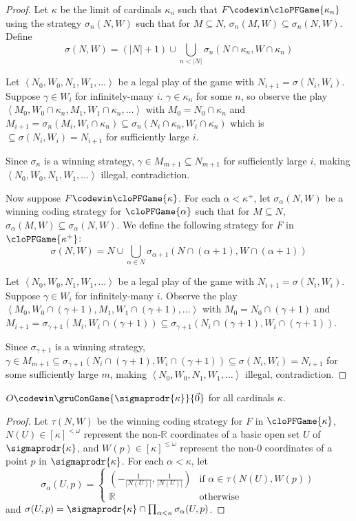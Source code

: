 \begin{proof}
Let $\kappa$ be the limit of cardinals $\kappa_n$ such that $F\codewin\cloPFGame{\kappa_n}$ using the strategy $\sigma_n(N,W)$ such that for $M\subseteq N$, $\sigma_n(M,W)\subseteq\sigma_n(N,W)$. Define \[\sigma(N,W)=(|N|+1)\cup\bigcup_{n<|N|}\sigma_n(N\cap\kappa_n,W\cap\kappa_n)\]

Let $\left<N_0,W_0,N_1,W_1,\dots\right>$ be a legal play of the game with $N_{i+1}=\sigma(N_i,W_i)$. Suppose $\gamma\in W_i$ for infinitely-many $i$. $\gamma\in\kappa_n$ for some $n$, so observe the play $\left<M_0,W_0\cap\kappa_n,M_1,W_1\cap\kappa_n,\dots\right>$ with $M_0=N_0\cap\kappa_n$ and $M_{i+1}=\sigma_n(M_i,W_i\cap\kappa_n)\subseteq\sigma_n(N_i\cap\kappa_n,W_i\cap\kappa_n)$ which is $\subseteq\sigma(N_i,W_i)=N_{i+1}$ for sufficiently large $i$.

Since $\sigma_n$ is a winning strategy, $\gamma\in M_{m+1}\subseteq N_{m+1}$ for sufficiently large $i$, making $\left<N_0,W_0,N_1,W_1,\dots\right>$ illegal, contradiction.

Now suppose $F\codewin\cloPFGame{\kappa}$. For each $\alpha<\kappa^+$, let $\sigma_\alpha(N,W)$ be a winning coding strategy for $\cloPFGame{\alpha}$ such that for $M\subseteq N$, $\sigma_\alpha(M,W)\subseteq\sigma_\alpha(N,W)$. We define the following strategy for $F$ in $\cloPFGame{\kappa^+}$: \[\sigma(N,W)=N\cup\bigcup_{\alpha\in N}\sigma_{\alpha+1}(N\cap(\alpha+1),W\cap(\alpha+1))\]

Let $\left<N_0,W_0,N_1,W_1,\dots\right>$ be a legal play of the game with $N_{i+1}=\sigma(N_i,W_i)$. Suppose $\gamma\in W_i$ for infinitely-many $i$. Observe the play $\left<M_0,W_0\cap(\gamma+1),M_1,W_1\cap(\gamma+1),\dots\right>$ with $M_0=N_0\cap(\gamma+1)$ and $M_{i+1}=\sigma_{\gamma+1}(M_i,W_i\cap(\gamma+1))\subseteq\sigma_{\gamma+1}(N_i\cap(\gamma+1),W_i\cap(\gamma+1))$.

Since $\sigma_{\gamma+1}$ is a winning strategy, $\gamma\in M_{m+1}\subseteq\sigma_{\gamma+1}(N_i\cap(\gamma+1),W_i\cap(\gamma+1))\subseteq\sigma(N_i,W_i)=N_{i+1}$ for some sufficiently large $m$, making $\left<N_0,W_0,N_1,W_1,\dots\right>$ illegal, contradiction.
\end{proof}

\begin{cor}
$O\codewin\gruConGame{\sigmaprodr{\kappa}}{\vec{0}}$ for all cardinals $\kappa$.
\end{cor}

\begin{proof}
Let $\tau(N,W)$ be the winning coding strategy for $F$ in $\cloPFGame{\kappa}$, $N(U)\in[\kappa]^{<\omega}$ represent the non-$\mathbb{R}$ coordinates of a basic open set $U$ of $\sigmaprodr{\kappa}$, and $W(p)\in[\kappa]^{\leq\omega}$ represent the non-$0$ coordinates of a point $p$ in $\sigmaprodr{\kappa}$. For each $\alpha<\kappa$, let \[\sigma_\alpha(U,p)=\left\{\begin{array}{ll}(-\frac{1}{|N(U)|},\frac{1}{|N(U)|})&\text{if }\alpha\in\tau(N(U),W(p))\\\mathbb{R}&\text{otherwise}\end{array}\right.\] and $\sigma(U,p)=\sigmaprodr{\kappa}\cap\prod_{\alpha<\kappa}\sigma_\alpha(U,p)$.
\end{proof}